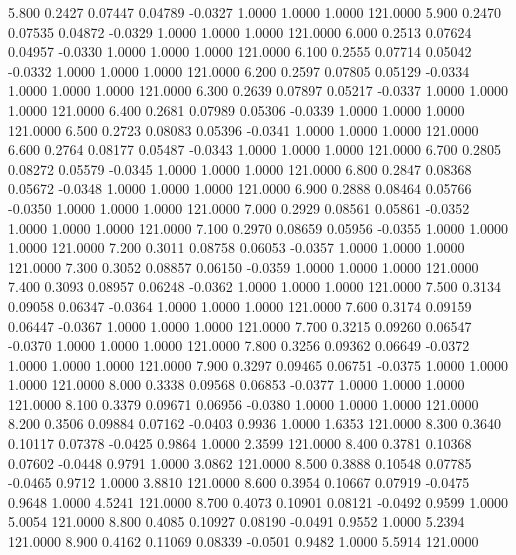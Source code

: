    5.800   0.2427   0.07447   0.04789  -0.0327   1.0000   1.0000   1.0000 121.0000
   5.900   0.2470   0.07535   0.04872  -0.0329   1.0000   1.0000   1.0000 121.0000
   6.000   0.2513   0.07624   0.04957  -0.0330   1.0000   1.0000   1.0000 121.0000
   6.100   0.2555   0.07714   0.05042  -0.0332   1.0000   1.0000   1.0000 121.0000
   6.200   0.2597   0.07805   0.05129  -0.0334   1.0000   1.0000   1.0000 121.0000
   6.300   0.2639   0.07897   0.05217  -0.0337   1.0000   1.0000   1.0000 121.0000
   6.400   0.2681   0.07989   0.05306  -0.0339   1.0000   1.0000   1.0000 121.0000
   6.500   0.2723   0.08083   0.05396  -0.0341   1.0000   1.0000   1.0000 121.0000
   6.600   0.2764   0.08177   0.05487  -0.0343   1.0000   1.0000   1.0000 121.0000
   6.700   0.2805   0.08272   0.05579  -0.0345   1.0000   1.0000   1.0000 121.0000
   6.800   0.2847   0.08368   0.05672  -0.0348   1.0000   1.0000   1.0000 121.0000
   6.900   0.2888   0.08464   0.05766  -0.0350   1.0000   1.0000   1.0000 121.0000
   7.000   0.2929   0.08561   0.05861  -0.0352   1.0000   1.0000   1.0000 121.0000
   7.100   0.2970   0.08659   0.05956  -0.0355   1.0000   1.0000   1.0000 121.0000
   7.200   0.3011   0.08758   0.06053  -0.0357   1.0000   1.0000   1.0000 121.0000
   7.300   0.3052   0.08857   0.06150  -0.0359   1.0000   1.0000   1.0000 121.0000
   7.400   0.3093   0.08957   0.06248  -0.0362   1.0000   1.0000   1.0000 121.0000
   7.500   0.3134   0.09058   0.06347  -0.0364   1.0000   1.0000   1.0000 121.0000
   7.600   0.3174   0.09159   0.06447  -0.0367   1.0000   1.0000   1.0000 121.0000
   7.700   0.3215   0.09260   0.06547  -0.0370   1.0000   1.0000   1.0000 121.0000
   7.800   0.3256   0.09362   0.06649  -0.0372   1.0000   1.0000   1.0000 121.0000
   7.900   0.3297   0.09465   0.06751  -0.0375   1.0000   1.0000   1.0000 121.0000
   8.000   0.3338   0.09568   0.06853  -0.0377   1.0000   1.0000   1.0000 121.0000
   8.100   0.3379   0.09671   0.06956  -0.0380   1.0000   1.0000   1.0000 121.0000
   8.200   0.3506   0.09884   0.07162  -0.0403   0.9936   1.0000   1.6353 121.0000
   8.300   0.3640   0.10117   0.07378  -0.0425   0.9864   1.0000   2.3599 121.0000
   8.400   0.3781   0.10368   0.07602  -0.0448   0.9791   1.0000   3.0862 121.0000
   8.500   0.3888   0.10548   0.07785  -0.0465   0.9712   1.0000   3.8810 121.0000
   8.600   0.3954   0.10667   0.07919  -0.0475   0.9648   1.0000   4.5241 121.0000
   8.700   0.4073   0.10901   0.08121  -0.0492   0.9599   1.0000   5.0054 121.0000
   8.800   0.4085   0.10927   0.08190  -0.0491   0.9552   1.0000   5.2394 121.0000
   8.900   0.4162   0.11069   0.08339  -0.0501   0.9482   1.0000   5.5914 121.0000
